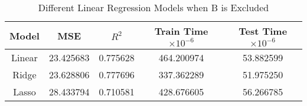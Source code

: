 \begin{table}[H]
\centering
\caption{Different Linear Regression Models when B is Excluded}
\label{tab:models}
\begin{tabular}{ccccc}
\toprule
Model & MSE & $R^2$ & Train Time $\times 10^{-6}$ & Test Time $\times 10^{-6}$ \\
\midrule
Linear & 23.425683 & 0.775628 & 464.200974 & 53.882599 \\
Ridge & 23.628806 & 0.777696 & 337.362289 & 51.975250 \\
Lasso & 28.433794 & 0.710581 & 428.676605 & 56.266785 \\
\bottomrule
\end{tabular}
\end{table}
